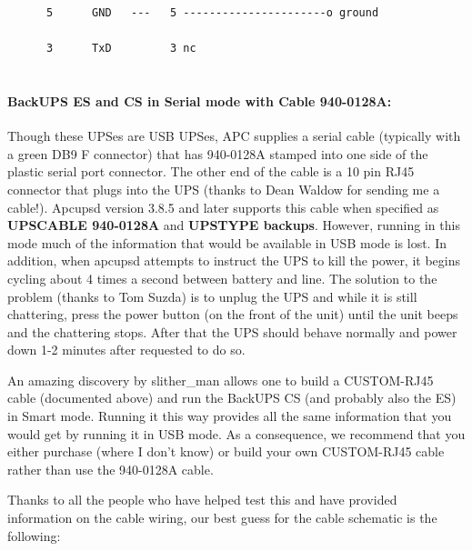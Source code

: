 {{{{{{{{{{\begin{verbatim}
      5      GND   ---   5 ----------------------o ground
     
      3      TxD         3 nc
     
\end{verbatim}
\normalsize

\label{BackUPS-ES-and-CS-in-Serial-mode-with-Cable-940_002d0128A}

\paragraph*{BackUPS ES and CS in Serial mode with Cable 940-0128A:}

\label{index-BackUPS-ES-211}
\label{index-Cables-212}
Though these UPSes are USB UPSes, APC supplies a serial cable (typically with
a green DB9 F connector) that has 940-0128A stamped into one side of the
plastic serial port connector. The other end of the cable is a 10 pin RJ45
connector that plugs into the UPS (thanks to Dean Waldow for sending me a
cable!). Apcupsd version 3.8.5 and later supports this cable when specified as
{\bf UPSCABLE 940-0128A} and {\bf UPSTYPE backups}. However, running in this
mode much of the information that would be available in USB mode is lost. In
addition, when apcupsd attempts to instruct the UPS to kill the power, it
begins cycling about 4 times a second between battery and line. The solution
to the problem (thanks to Tom Suzda) is to unplug the UPS and while it is
still chattering, press the power button (on the front of the unit) until the
unit beeps and the chattering stops. After that the UPS should behave normally
and power down 1-2 minutes after requested to do so.  

An amazing discovery by slither\_man allows one to build a CUSTOM-RJ45 cable
(documented above) and run the BackUPS CS (and probably also the ES) in Smart
mode. Running it this way provides all the same information that you would get
by running it in USB mode. As a consequence, we recommend that you either
purchase (where I don't know) or build your own CUSTOM-RJ45 cable rather than
use the 940-0128A cable.  

Thanks to all the people who have helped test this and have provided
information on the cable wiring, our best guess for the cable schematic is the
following: 

\footnotesize
\begin{verbatim}
     

\end{verbatim}}}}}}}}}}}
